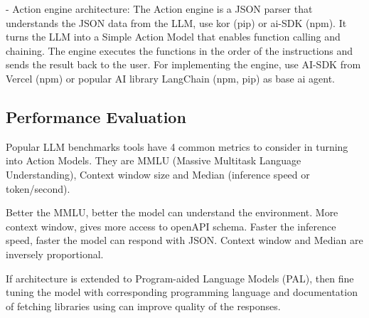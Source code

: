\documentclass[conference]{IEEEtran}
\begin{document}
- Action engine architecture: The Action engine is a JSON parser that understands the JSON data from the LLM, use kor (pip) or ai-SDK (npm). It turns the LLM into a Simple Action Model that enables function calling and chaining. The engine executes the functions in the order of the instructions and sends the result back to the user. For implementing the engine, use AI-SDK from Vercel (npm) or popular AI library LangChain (npm, pip) as base ai agent.


\subsection{Performance Evaluation}
Popular LLM benchmarks tools have 4 common metrics to consider in turning into Action Models. They are MMLU (Massive Multitask Language Understanding), Context window size and Median (inference speed or token/second). 

Better the MMLU, better the model can understand the environment. More context window, gives more access to openAPI schema. Faster the inference speed, faster the model can respond with JSON. Context window and Median are inversely proportional. 

If architecture is extended to Program-aided Language Models (PAL), then fine tuning the model with corresponding programming language and documentation of fetching libraries using can improve quality of the responses.








\end{document}
